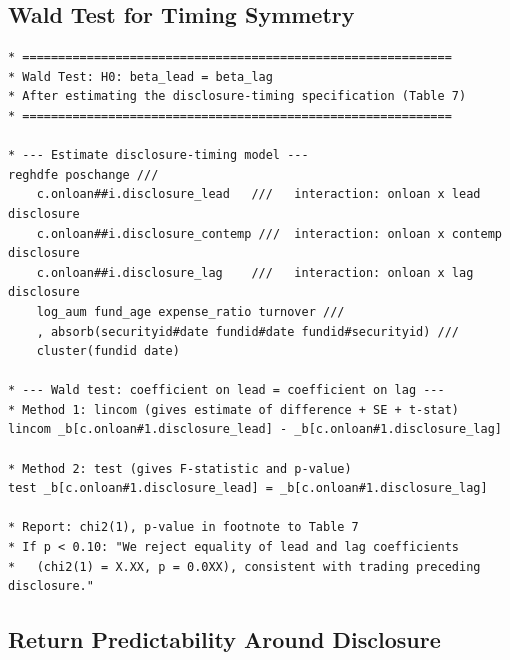 \documentclass[11pt, a4paper]{article}
\begin{document}
\subsection{Wald Test for Timing Symmetry}\label{sec:stata-wald}

\begin{lstlisting}[language={}]
* ============================================================
* Wald Test: H0: beta_lead = beta_lag
* After estimating the disclosure-timing specification (Table 7)
* ============================================================

* --- Estimate disclosure-timing model ---
reghdfe poschange ///
    c.onloan##i.disclosure_lead   ///   interaction: onloan x lead disclosure
    c.onloan##i.disclosure_contemp ///  interaction: onloan x contemp disclosure
    c.onloan##i.disclosure_lag    ///   interaction: onloan x lag disclosure
    log_aum fund_age expense_ratio turnover ///
    , absorb(securityid#date fundid#date fundid#securityid) ///
    cluster(fundid date)

* --- Wald test: coefficient on lead = coefficient on lag ---
* Method 1: lincom (gives estimate of difference + SE + t-stat)
lincom _b[c.onloan#1.disclosure_lead] - _b[c.onloan#1.disclosure_lag]

* Method 2: test (gives F-statistic and p-value)
test _b[c.onloan#1.disclosure_lead] = _b[c.onloan#1.disclosure_lag]

* Report: chi2(1), p-value in footnote to Table 7
* If p < 0.10: "We reject equality of lead and lag coefficients
*   (chi2(1) = X.XX, p = 0.0XX), consistent with trading preceding disclosure."
\end{lstlisting}

\subsection{Return Predictability Around Disclosure}\label{sec:stata-returns}
\end{document}
